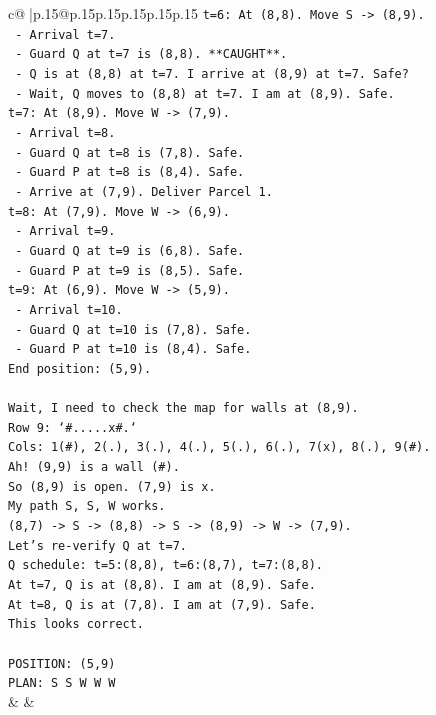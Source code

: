 \documentclass{article}
\begin{document}
{\begin{supertabular}{c@{$\;$}|p{.15\linewidth}@{}p{.15\linewidth}p{.15\linewidth}p{.15\linewidth}p{.15\linewidth}p{.15\linewidth}}
{{{\texttt{t=6: At (8,8). Move S {-}> (8,9).} \\
\texttt{  {-} Arrival t=7.} \\
\texttt{  {-} Guard Q at t=7 is (8,8). **CAUGHT**.} \\
\texttt{  {-} Q is at (8,8) at t=7. I arrive at (8,9) at t=7. Safe?} \\
\texttt{  {-} Wait, Q moves to (8,8) at t=7. I am at (8,9). Safe.} \\
\texttt{t=7: At (8,9). Move W {-}> (7,9).} \\
\texttt{  {-} Arrival t=8.} \\
\texttt{  {-} Guard Q at t=8 is (7,8). Safe.} \\
\texttt{  {-} Guard P at t=8 is (8,4). Safe.} \\
\texttt{  {-} Arrive at (7,9). Deliver Parcel 1.} \\
\texttt{t=8: At (7,9). Move W {-}> (6,9).} \\
\texttt{  {-} Arrival t=9.} \\
\texttt{  {-} Guard Q at t=9 is (6,8). Safe.} \\
\texttt{  {-} Guard P at t=9 is (8,5). Safe.} \\
\texttt{t=9: At (6,9). Move W {-}> (5,9).} \\
\texttt{  {-} Arrival t=10.} \\
\texttt{  {-} Guard Q at t=10 is (7,8). Safe.} \\
\texttt{  {-} Guard P at t=10 is (8,4). Safe.} \\
\texttt{End position: (5,9).} \\
\\ 
\texttt{Wait, I need to check the map for walls at (8,9).} \\
\texttt{Row 9: `\#.....x\#.`} \\
\texttt{Cols: 1(\#), 2(.), 3(.), 4(.), 5(.), 6(.), 7(x), 8(.), 9(\#).} \\
\texttt{Ah! (9,9) is a wall (\#).} \\
\texttt{So (8,9) is open. (7,9) is x.} \\
\texttt{My path S, S, W works.} \\
\texttt{(8,7) {-}> S {-}> (8,8) {-}> S {-}> (8,9) {-}> W {-}> (7,9).} \\
\texttt{Let's re{-}verify Q at t=7.} \\
\texttt{Q schedule: t=5:(8,8), t=6:(8,7), t=7:(8,8).} \\
\texttt{At t=7, Q is at (8,8). I am at (8,9). Safe.} \\
\texttt{At t=8, Q is at (7,8). I am at (7,9). Safe.} \\
\texttt{This looks correct.} \\
\\ 
\texttt{POSITION: (5,9)} \\
\texttt{PLAN: S S W W W} \\
            }
        }
    }
    & & \\ \\


\end{supertabular}}
\end{document}

